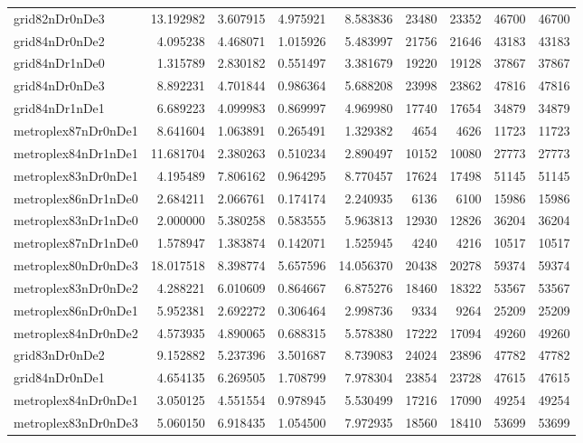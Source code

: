 \begin{longtable}{|l|r|r|r|r|r|r|r|r|}
grid82nDr0nDe3 & 13.192982 & 3.607915 & 4.975921 & 8.583836 & 23480 & 23352 & 46700 & 46700 \\
grid84nDr0nDe2 & 4.095238 & 4.468071 & 1.015926 & 5.483997 & 21756 & 21646 & 43183 & 43183 \\
grid84nDr1nDe0 & 1.315789 & 2.830182 & 0.551497 & 3.381679 & 19220 & 19128 & 37867 & 37867 \\
grid84nDr0nDe3 & 8.892231 & 4.701844 & 0.986364 & 5.688208 & 23998 & 23862 & 47816 & 47816 \\
grid84nDr1nDe1 & 6.689223 & 4.099983 & 0.869997 & 4.969980 & 17740 & 17654 & 34879 & 34879 \\
metroplex87nDr0nDe1 & 8.641604 & 1.063891 & 0.265491 & 1.329382 & 4654 & 4626 & 11723 & 11723 \\
metroplex84nDr1nDe1 & 11.681704 & 2.380263 & 0.510234 & 2.890497 & 10152 & 10080 & 27773 & 27773 \\
metroplex83nDr0nDe1 & 4.195489 & 7.806162 & 0.964295 & 8.770457 & 17624 & 17498 & 51145 & 51145 \\
metroplex86nDr1nDe0 & 2.684211 & 2.066761 & 0.174174 & 2.240935 & 6136 & 6100 & 15986 & 15986 \\
metroplex83nDr1nDe0 & 2.000000 & 5.380258 & 0.583555 & 5.963813 & 12930 & 12826 & 36204 & 36204 \\
metroplex87nDr1nDe0 & 1.578947 & 1.383874 & 0.142071 & 1.525945 & 4240 & 4216 & 10517 & 10517 \\
metroplex80nDr0nDe3 & 18.017518 & 8.398774 & 5.657596 & 14.056370 & 20438 & 20278 & 59374 & 59374 \\
metroplex83nDr0nDe2 & 4.288221 & 6.010609 & 0.864667 & 6.875276 & 18460 & 18322 & 53567 & 53567 \\
metroplex86nDr0nDe1 & 5.952381 & 2.692272 & 0.306464 & 2.998736 & 9334 & 9264 & 25209 & 25209 \\
metroplex84nDr0nDe2 & 4.573935 & 4.890065 & 0.688315 & 5.578380 & 17222 & 17094 & 49260 & 49260 \\
grid83nDr0nDe2 & 9.152882 & 5.237396 & 3.501687 & 8.739083 & 24024 & 23896 & 47782 & 47782 \\
grid84nDr0nDe1 & 4.654135 & 6.269505 & 1.708799 & 7.978304 & 23854 & 23728 & 47615 & 47615 \\
metroplex84nDr0nDe1 & 3.050125 & 4.551554 & 0.978945 & 5.530499 & 17216 & 17090 & 49254 & 49254 \\
metroplex83nDr0nDe3 & 5.060150 & 6.918435 & 1.054500 & 7.972935 & 18560 & 18410 & 53699 & 53699 \\

\end{longtable}
